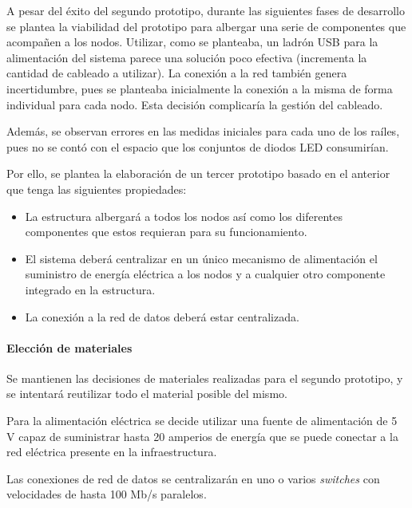 A pesar del éxito del segundo prototipo, durante las siguientes fases de desarrollo se plantea la viabilidad del prototipo para albergar una serie de componentes que acompañen a los nodos. Utilizar, como se planteaba, un ladrón USB %
para la alimentación del sistema parece una solución poco efectiva (incrementa la cantidad de cableado a utilizar). La conexión a la red también genera incertidumbre, pues se planteaba inicialmente la conexión a la misma de forma individual para cada nodo. Esta decisión complicaría la gestión del cableado.

Además, se observan errores en las medidas iniciales para cada uno de los raíles, pues no se contó con el espacio que los conjuntos de diodos LED consumirían\citationneeded[LED].

Por ello, se plantea la elaboración de un tercer prototipo basado en el anterior que tenga las siguientes propiedades:

\begin{itemize}

\item La estructura albergará a todos los nodos así como los diferentes componentes que estos requieran para su funcionamiento.

\item El sistema deberá centralizar en un único mecanismo de alimentación el suministro de energía eléctrica a los nodos y a cualquier otro componente integrado en la estructura.

\item La conexión a la red de datos deberá estar centralizada.

\end{itemize}

\paragraph{Elección de materiales\\}

Se mantienen las decisiones de materiales realizadas para el segundo prototipo, y se intentará reutilizar todo el material posible del mismo.

Para la alimentación eléctrica se decide utilizar una fuente de alimentación de 5 V capaz de suministrar hasta 20 amperios de energía que se puede conectar a la red eléctrica presente en la infraestructura.

Las conexiones de red de datos se centralizarán en uno o varios \textit{switches} con velocidades de hasta 100 Mb/s paralelos.

